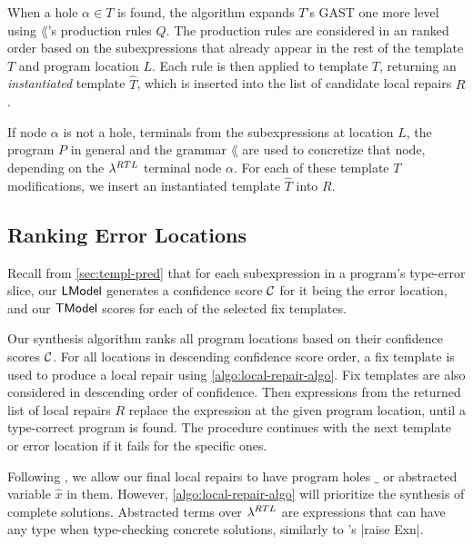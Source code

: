 When a hole $\alpha \in T$ is found, the algorithm expands $T$'s GAST one more
level using $\lang$'s production rules $Q$. The production rules are considered
in an ranked order based on the subexpressions that already appear in the rest
of the template $T$ and program location $L$. Each rule is then applied to
template $T$, returning an \emph{instantiated} template $\hat{T}$, which is
inserted into the list of candidate local repairs $R$.

If node $\alpha$ is not a hole, terminals from the subexpressions at location
$L$, the program $P$ in general and the grammar $\lang$ are used to concretize
that node, depending on the $\lambda^{RTL}$ terminal node $\alpha$. For each of
these template $T$ modifications, we insert an instantiated template $\hat{T}$
into $R$.

\subsection{Ranking Error Locations}
\label{sec:synthesis:location-rank}

Recall from \autoref{sec:templ-pred} that for each subexpression in a program's
type-error slice, our $\mathsf{LModel}$ generates a confidence score $\mathcal{C}$ for it being
the error location, and our $\mathsf{TModel}$ scores for each of the selected fix
templates.

Our synthesis algorithm ranks all program locations based on their confidence
scores $\mathcal{C}$. For all locations in descending confidence score order, a fix
template is used to produce a local repair using
\autoref{algo:local-repair-algo}. Fix templates are also considered in
descending order of confidence. Then expressions from the returned list of local
repairs $R$ replace the expression at the given program location, until a
type-correct program is found. The procedure continues with the next template or
error location if it fails for the specific ones.

Following \citep{Lerner2007-dt}, we allow our final local repairs to have
program holes $\_$ or abstracted variable $\hat{x}$ in them. However,
\autoref{algo:local-repair-algo} will prioritize the synthesis of complete
solutions. Abstracted terms over $\lambda^{RTL}$ are expressions that can have any
type when type-checking concrete solutions, \eg similarly to \ocaml's |raise Exn|.


